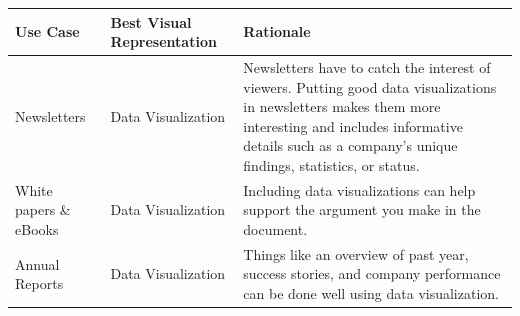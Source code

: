 \documentclass[]{book}
\theoremstyle{definition}
\theoremstyle{definition}
\theoremstyle{definition}
\theoremstyle{remark}
\begin{document}
\begin{longtable}[]{@{}lll@{}}
\toprule
\begin{minipage}[b]{0.09\columnwidth}\raggedright\strut
Use Case\strut
\end{minipage} & \begin{minipage}[b]{0.26\columnwidth}\raggedright\strut
Best Visual Representation\strut
\end{minipage} & \begin{minipage}[b]{0.57\columnwidth}\raggedright\strut
Rationale\strut
\end{minipage}\tabularnewline
\midrule
\endhead
\begin{minipage}[t]{0.09\columnwidth}\raggedright\strut
Newsletters\strut
\end{minipage} & \begin{minipage}[t]{0.26\columnwidth}\raggedright\strut
Data Visualization\strut
\end{minipage} & \begin{minipage}[t]{0.57\columnwidth}\raggedright\strut
Newsletters have to catch the interest of viewers. Putting good data
visualizations in newsletters makes them more interesting and includes
informative details such as a company's unique findings, statistics, or
status.\strut
\end{minipage}\tabularnewline
\begin{minipage}[t]{0.09\columnwidth}\raggedright\strut
White papers \& eBooks\strut
\end{minipage} & \begin{minipage}[t]{0.26\columnwidth}\raggedright\strut
Data Visualization\strut
\end{minipage} & \begin{minipage}[t]{0.57\columnwidth}\raggedright\strut
Including data visualizations can help support the argument you make in
the document.\strut
\end{minipage}\tabularnewline
\begin{minipage}[t]{0.09\columnwidth}\raggedright\strut
Annual Reports\strut
\end{minipage} & \begin{minipage}[t]{0.26\columnwidth}\raggedright\strut
Data Visualization\strut
\end{minipage} & \begin{minipage}[t]{0.57\columnwidth}\raggedright\strut
Things like an overview of past year, success stories, and company
performance can be done well using data visualization.\strut
\end{minipage}\tabularnewline

\end{longtable}
\end{document}
